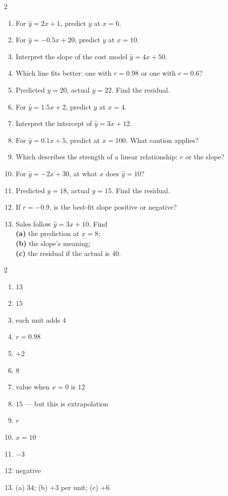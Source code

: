 \documentclass[11pt]{article}
\begin{document}
\clearpage
{}

\begin{recapbox}
\begin{multicols}{2}
\small
\begin{enumerate}[leftmargin=*,itemsep=3pt]
  \item For $\hat y=2x+1$, predict $y$ at $x=6$.
  \item For $\hat y=-0.5x+20$, predict $y$ at $x=10$.
  \item Interpret the slope of the cost model $\hat y=4x+50$.
  \item Which line fits better: one with $r=0.98$ or one with $r=0.6$?
  \item Predicted $y=20$, actual $y=22$. Find the residual.
  \item For $\hat y=1.5x+2$, predict $y$ at $x=4$.
  \item Interpret the intercept of $\hat y=3x+12$.
  \item For $\hat y=0.1x+5$, predict at $x=100$. What caution applies?
  \item Which describes the strength of a linear relationship: $r$ or the slope?
  \item For $\hat y=-2x+30$, at what $x$ does $\hat y=10$?
  \item Predicted $y=18$, actual $y=15$. Find the residual.
  \item If $r=-0.9$, is the best-fit slope positive or negative?
  \item Sales follow $\hat y=3x+10$. Find \\ \textbf{(a)} the prediction at $x=8$; \\ \textbf{(b)} the slope's meaning; \\ \textbf{(c)} the residual if the actual is $40$.
\end{enumerate}
\end{multicols}
\end{recapbox}

\begin{keybox}
\begin{multicols}{2}
\small
\begin{enumerate}[leftmargin=*,itemsep=3pt]
  \item $13$
  \item $15$
  \item each unit adds $4$
  \item $r=0.98$
  \item $+2$
  \item $8$
  \item value when $x=0$ is $12$
  \item $15$ --- but this is extrapolation
  \item $r$
  \item $x=10$
  \item $-3$
  \item negative
  \item (a) $34$; (b) $+3$ per unit; (c) $+6$
\end{enumerate}
\end{multicols}
\end{keybox}
\end{document}

